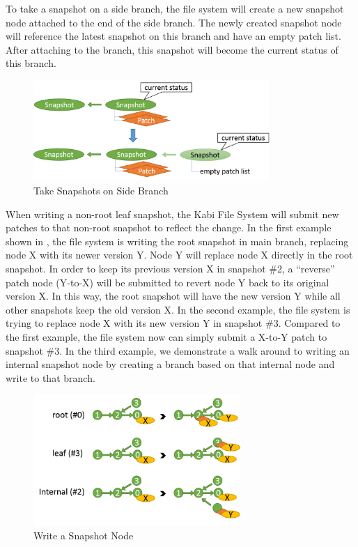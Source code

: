 	To take a snapshot on a side branch, the file system will create a new snapshot node attached to the end of the side branch. The newly created snapshot node will reference the latest snapshot on this branch and have an empty patch list. After attaching to the branch, this snapshot will become the current status of this branch.

\begin{figure}[hbtp]
\centering
\includegraphics[width=0.8\textwidth]{Chapter-4/figs/fig21.png}
\caption{Take Snapshots on Side Branch}
\label{fig:take_snapshot_nonroot}
\end{figure}
    
    When writing a non-root leaf snapshot, the Kabi File System will submit new patches to that non-root snapshot to reflect the change. In the first example shown in , the file system is writing the root snapshot in main branch, replacing node X with its newer version Y. Node Y will replace node X directly in the root snapshot. In order to keep its previous version X in snapshot \#2, a ``reverse'' patch node (Y-to-X) will be submitted to revert node Y back to its original version X. In this way, the root snapshot will have the new version Y while all other snapshots keep the old version X. In the second example, the file system is trying to replace node X with its new version Y in snapshot \#3. Compared to the first example, the file system now can simply submit a X-to-Y patch to snapshot \#3. In the third example, we demonstrate a walk around to writing an internal snapshot node by creating a branch based on that internal node and write to that branch.

\begin{figure}[hbtp]
\centering
\includegraphics[width=0.7\textwidth]{Chapter-4/figs/fig17.png}
\caption{Write a Snapshot Node}
\label{fig:write_snapshot_node}
\end{figure}

